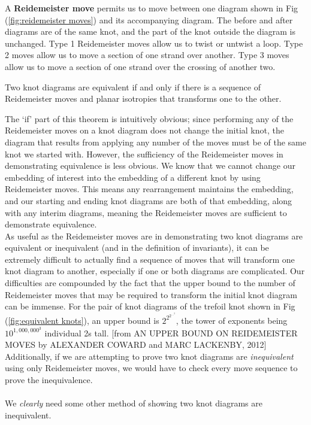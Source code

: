 \documentclass{article}
\begin{document}
\begin{definition}[] A \textbf{Reidemeister move} permits us to move between one diagram shown in Fig (\ref{fig:reidemeister moves}) and its accompanying diagram. The before and after diagrams are of the same knot, and the part of the knot outside the diagram is unchanged. Type 1 Reidemeister moves allow us to twist or untwist a loop. Type 2 moves allow us to move a section of one strand over another. Type 3 moves allow us to move a section of one strand over the crossing of another two.\\
\end{definition}

\begin{theorem}Two knot diagrams are equivalent if and only if there is a sequence of Reidemeister moves and planar isotropies that transforms one to the other.\\
\end{theorem}
The `if' part of this theorem is intuitively obvious; since performing any of the Reidemeister moves on a knot diagram does not change the initial knot, the diagram that results from applying any number of the moves must be of the same knot we started with. However, the sufficiency of the Reidemeister moves in demonstrating equivalence is less obvious. We know that we cannot change our embedding of interest into the embedding of a different knot by using Reidemeister moves. This means any rearrangement maintains the embedding, and our starting and ending knot diagrams are both of that embedding, along with any interim diagrams, meaning the Reidemeister moves are sufficient to demonstrate equivalence.\\

As useful as the Reidemeister moves are in demonstrating two knot diagrams are equivalent or inequivalent (and in the definition of invariants), it can be extremely difficult to actually find a sequence of moves that will transform one knot diagram to another, especially if one or both diagrams are complicated. Our difficulties are compounded by the fact that the upper bound to the number of Reidemeister moves that may be required to transform the initial knot diagram can be immense. For the pair of knot diagrams of the trefoil knot shown in Fig (\ref{fig:equivalent knots}), an upper bound is $2^{2^{2^{...^3}}}$, the tower of exponents being $10^{1,000,000^3}$ individual 2s tall. [from AN UPPER BOUND ON REIDEMEISTER MOVES by ALEXANDER COWARD and MARC LACKENBY, 2012] Additionally, if we are attempting to prove two knot diagrams are \emph{inequivalent} using only Reidemeister moves, we would have to check every move sequence to prove the inequivalence.\\ 
\\
 We \emph{clearly} need some other method of showing two knot diagrams are inequivalent.\\
 
\end{document}
